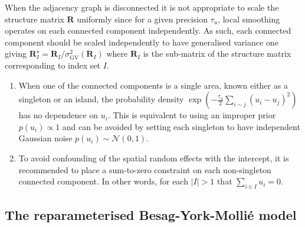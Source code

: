 \documentclass[a4paper, nobind]{templates/ociamthesis}
\providecommand{\tightlist}{%
  \setlength{\itemsep}{0pt}\setlength{\parskip}{0pt}}
\begin{document}
When the adjacency graph is disconnected it is not appropriate to scale the structure matrix \(\mathbf{R}\) uniformly since for a given precision \(\tau_u\), local smoothing operates on each connected component independently.
As such, each connected component should be scaled independently to have generalised variance one giving \(\mathbf{R}^\star_I = \mathbf{R}_I / \sigma^2_{\text{GV}}(\mathbf{R}_I)\) where \(\mathbf{R}_I\) is the sub-matrix of the structure matrix corresponding to index set \(I\).

\begin{enumerate}
\def\labelenumi{\arabic{enumi}.}
\setcounter{enumi}{1}
\tightlist
\item
  When one of the connected components is a single area, known either as a singleton or an island, the probability density \(\exp \left( -\frac{\tau_u}{2} \sum_{i \sim j} (u_i - u_j)^2 \right)\) has no dependence on \(u_i\).
  This is equivalent to using an improper prior \(p(u_i) \propto 1\) and can be avoided by setting each singleton to have independent Gaussian noise \(p(u_i) \sim \mathcal{N}(0, 1)\).
\item
  To avoid confounding of the spatial random effects with the intercept, it is recommended to place a sum-to-zero constraint on each non-singleton connected component.
  In other words, for each \(|I| > 1\) that \(\sum_{i \in I} u_i = 0\).
\end{enumerate}

\hypertarget{the-reparameterised-besag-york-molliuxe9-model}{%
\subsection{The reparameterised Besag-York-Mollié model}\label{the-reparameterised-besag-york-molliuxe9-model}}
\end{document}
